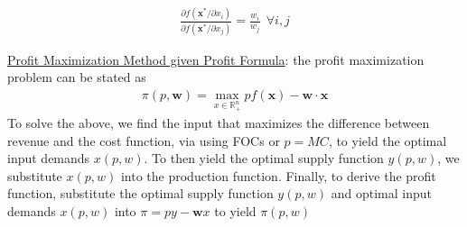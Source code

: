 \documentclass{article}
\begin{document}
  \begin{gather*}
    \frac{\partial f(\mathbf{x}^{*} / \partial x_{i})}{\partial f (\mathbf{x}^{*} / \partial x_{j})} = \frac{w_{i}}{w_{j}} \ \ \forall i, j
  \end{gather*}
  \par
  \underline{Profit Maximization Method given Profit Formula}: the profit maximization problem can be stated as
  \begin{gather*}
    \pi (p,\mathbf{w}) = \max_{x \in \mathbb{R}_{+}^{n}} pf(\mathbf{x}) - \mathbf{w} \cdot \mathbf{x}
  \end{gather*}
  To solve the above, we find the input that  maximizes the difference between revenue and the cost function, via using FOCs or $p = MC$, to yield the optimal input demands $x(p,w)$. To then yield the optimal supply function $y(p,w)$, we substitute $x(p,w)$ into the production function. Finally, to derive the profit function, substitute the optimal supply function $y(p,w)$ and optimal input demands $x(p,w)$ into $\pi = py - \mathbf{w}x$ to yield $\pi(p,w)$
\end{document}
